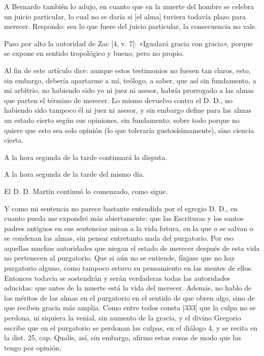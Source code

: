 A Bernardo también lo adujo, en cuanto que en la muerte del hombre se celebra un juicio particular, lo cual no se daría si [el alma] tuviera todavía plazo para merecer. Respondo: sea lo que fuere del juicio particular, la consecuencia no vale.

Paso por alto la autoridad de Zac [4, v. 7]: «Igualará gracia con gracia», porque se expone en sentido tropológico y bueno, pero no propio.

Al fin de este artículo dice: aunque estos testimonios no fuesen tan claros, esto, sin embargo, debería apartarme a mí, teólogo, a saber, que así sin fundamento, a mi arbitrio, no habiendo sido yo ni juez ni asesor, habría prorrogado a las almas que parten el término de merecer. Lo mismo devuelvo contra el D. D., no habiendo sido tampoco él ni juez ni asesor, y sin embargo define para las almas un estado cierto según sus opiniones, sin fundamento; sobre todo porque no quiere que esto sea solo opinión (lo que toleraría gustosísimamente), sino ciencia cierta.

A la hora segunda de la tarde continuará la disputa.

A la hora segunda de la tarde del mismo día.

El D. D. Martín continuó lo comenzado, como sigue.

Y como mi sentencia no parece bastante entendida por el egregio D. D., en cuanto pueda me expondré más abiertamente: que las Escrituras y los santos padres antiguos en sus sentencias miran a la vida futura, en la que o se salvan o se condenan las almas, sin pensar entretanto nada del purgatorio. Por eso aquellas muchas autoridades que niegan el estado de merecer después de esta vida no pertenecen al purgatorio. Que si aún no se entiende, fínjase que no hay purgatorio alguno, como tampoco estuvo su pensamiento en las mentes de ellos. Entonces todavía se sostendrán y serán verdaderas todas las autoridades aducidas: que antes de la muerte está la vida del merecer. Además, no hablo de los méritos de las almas en el purgatorio en el sentido de que obren algo, sino de que reciben gracia más amplia. Como entre todos consta [333] que la culpa no se perdona, ni siquiera la venial, sin aumento de la gracia, y el divino Gregorio escribe que en el purgatorio se perdonan las culpas, en el diálogo 4, y se recita en la dist. 25, cap. Qualis, así, sin embargo, afirmo estas cosas de modo que las tengo por opinión,

